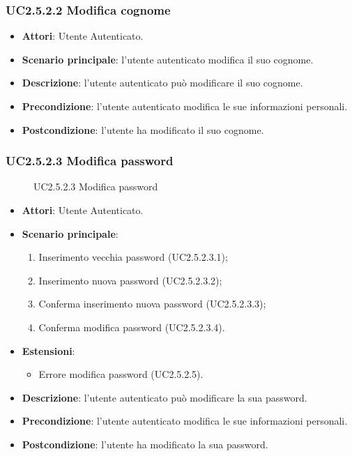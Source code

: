 \subsubsection{UC2.5.2.2 Modifica cognome}
\begin{itemize}
\item \textbf{Attori}: Utente Autenticato.
\item \textbf{Scenario principale}: l'utente autenticato modifica il suo cognome.
\item \textbf{Descrizione}: l'utente autenticato può modificare il suo cognome.
\item \textbf{Precondizione}: l'utente autenticato modifica le sue informazioni personali.
\item \textbf{Postcondizione}: l'utente ha modificato il suo cognome.
\end{itemize}
\subsubsection{UC2.5.2.3 Modifica password}
\begin{figure}[H]
\centering
\noindent{}
\caption{UC2.5.2.3 Modifica password}
\end{figure}
\begin{itemize}
\item \textbf{Attori}: Utente Autenticato.
\item \textbf{Scenario principale}:
\begin{enumerate}
\item Inserimento vecchia password (UC2.5.2.3.1);
\item Inserimento nuova password (UC2.5.2.3.2);
\item Conferma inserimento nuova password (UC2.5.2.3.3);
\item Conferma modifica password (UC2.5.2.3.4).
\end{enumerate}
\item \textbf{Estensioni}:
\begin{itemize}
\item Errore modifica password (UC2.5.2.5).
\end{itemize}
\item \textbf{Descrizione}: l'utente autenticato può modificare la sua password.
\item \textbf{Precondizione}: l'utente autenticato modifica le sue informazioni personali.
\item \textbf{Postcondizione}: l'utente ha modificato la sua password.
\end{itemize}
